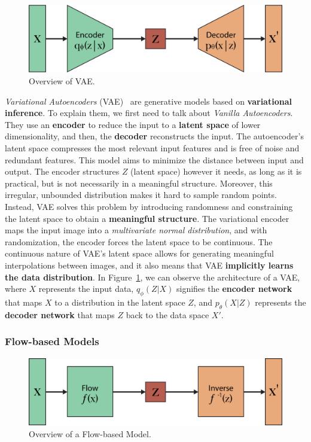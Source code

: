 \documentclass[sn-mathphys,Numbered]{sn-jnl}
\theoremstyle{thmstyleone}%
\theoremstyle{thmstyletwo}%
\theoremstyle{thmstylethree}%
\begin{document}
\begin{figure}[t]
	\centering
    \includegraphics[scale=0.8]{img/svg/VAE.png}
    \caption{Overview of VAE.}\label{fig:vae}
\end{figure}

\emph{Variational Autoencoders} (VAE)~\cite{kingma2022autoencoding} are generative models based on \textbf{variational inference}.
To explain them, we first need to talk about \emph{Vanilla Autoencoders}.
They use an \textbf{encoder} to reduce the input to a \textbf{latent space} of lower dimensionality, and then, the \textbf{decoder} reconstructs the input. 
The autoencoder's latent space compresses the most relevant input features and is free of noise and redundant features.
This model aims to minimize the distance between input and output. The encoder structures $Z$ (latent space) however it needs, as long as it is practical, but is not necessarily in a meaningful structure. 
Moreover, this irregular, unbounded distribution makes it hard to sample random points.
Instead, VAE solves this problem by introducing randomness and constraining the latent space to obtain a \textbf{meaningful structure}. 
The variational encoder maps the input image into a \emph{multivariate normal distribution}, and with randomization, the encoder forces the latent space to be continuous. 
The continuous nature of VAE's latent space allows for generating meaningful interpolations between images, and it also means that VAE \textbf{implicitly learns the data distribution}. In Figure~\ref{fig:vae}, we can observe the architecture of a VAE, where $X$ represents the input data, $q_\phi(Z|X)$ signifies the \textbf{encoder network} that maps $X$ to a distribution in the latent space $Z$, and $p_\theta(X|Z)$ represents the \textbf{decoder network} that maps $Z$ back to the data space $X'$.

\subsubsection{Flow-based Models}\label{sec:flow}

\begin{figure}[b]
	\centering
    \includegraphics[scale=0.8]{img/svg/FB.png}
    \caption{Overview of a Flow-based Model.}\label{fig:flow}
\end{figure}
\end{document}
